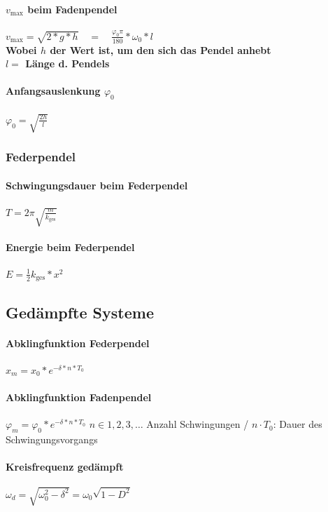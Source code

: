 \documentclass[12pt, a4paper]{scrreprt}
\begin{document}
\paragraph{\(v_{\max}\) beim Fadenpendel} \dotfill \(v_{\max} = \sqrt{2 * g * h} \quad = \quad \frac{\varphi_0 \pi}{180} * \omega_0 * l\)\\[1em]
\myhspace \textbf{Wobei \(h\) der Wert ist, um den sich das Pendel anhebt}\\
\myhspace \textbf{\(l=\) Länge d. Pendels}
\paragraph{Anfangsauslenkung \(\varphi_0\)} \dotfill \(\varphi_0 = \sqrt{\frac{2h}{l}}\)

\subsubsection{Federpendel}

\paragraph{Schwingungsdauer beim Federpendel} \dotfill \(T = 2\pi \sqrt{\frac{m}{k_{\text{ges}}}}\)
\paragraph{Energie beim Federpendel} \dotfill \(E = \frac{1}{2} k_{\text{ges}} * x^2\)

\subsection{Gedämpfte Systeme}

\paragraph{Abklingfunktion Federpendel} \dotfill \(x_m=x_0*e^{-\delta * n * T_0}\)
\paragraph{Abklingfunktion Fadenpendel} \dotfill \(\varphi_m = \varphi_0 * e^{-\delta * n * T_0}\)
\myhspace{} \(n \in 1, 2, 3, \dots\) Anzahl Schwingungen / \(n \cdot T_0\): Dauer des Schwingungsvorgangs
\paragraph{Kreisfrequenz gedämpft} \dotfill \(\omega_d=\sqrt{\omega_0^2-\delta^2} = \omega_0\sqrt{1-D^2}\)
\end{document}

